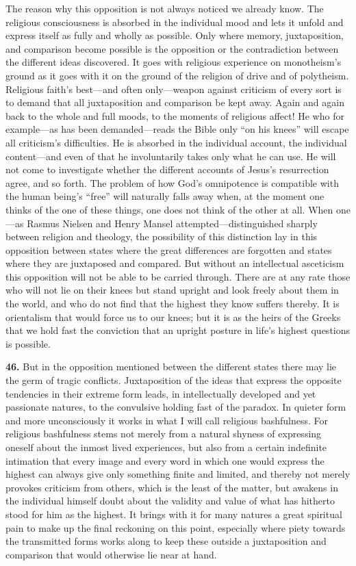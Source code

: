 \documentclass[12pt,a4paper]{book}
\newcommand{\opage}[1]{\marginnote{\footnotesize\textit{[#1]}}}
\begin{document}
The reason why this opposition is not always noticed we already know. The religious
consciousness is absorbed in the individual mood and lets it unfold and express itself as
fully and wholly as possible. Only where memory, juxtaposition, and comparison become
possible is the opposition or the contradiction between the different ideas discovered. It
goes with religious experience on monotheism's ground as it goes with it on the ground of
the religion of drive and of polytheism. Religious faith's best---and often only---weapon
against criticism of every sort is to demand that all juxtaposition and comparison be kept
away. Again and again back to the whole and full moods, to the moments of religious affect!
He who for example---as has been demanded---reads the Bible only ``on his knees'' will
escape all criticism's difficulties. He is absorbed in the individual account, the individual
content---and even of that he involuntarily takes only what he can use. He will not come to
investigate whether the different accounts of Jesus's resurrection 
\opage{107}agree, and so forth. The
problem of how God's omnipotence is compatible with the human being's ``free'' will naturally
falls away when, at the moment one thinks of the one of these things, one does not think of
the other at all. When one---as Rasmus Nielsen and Henry Mansel attempted---distinguished
sharply between religion and theology, the possibility of this distinction lay in this
opposition between states where the great differences are forgotten and states where they are
juxtaposed and compared. But without an intellectual asceticism this opposition will not be
able to be carried through. There are at any rate those who will not lie on their knees but
stand upright and look freely about them in the world, and who do not find that the highest
they know suffers thereby. It is orientalism that would force us to our knees; but it is as
the heirs of the Greeks that we hold fast the conviction that an upright posture in life's
highest questions is possible.

\medskip

\noindent\textbf{46.} But in the opposition mentioned between the different states there may
lie the germ of tragic conflicts. Juxtaposition of the ideas that express the opposite
tendencies in their extreme form leads, in intellectually developed and yet passionate
natures, to the convulsive holding fast of the paradox. In quieter form and more unconsciously
it works in what I will call religious bashfulness. For religious bashfulness stems not merely
from a natural shyness of expressing oneself about the inmost lived experiences, but also from
a certain indefinite intimation that every image and every word in which one would express the
highest can always give only something finite and limited, and thereby not merely provokes
criticism from others, which is the least of the matter, but awakens in the individual himself
doubt about the validity and value of what has hitherto stood for him as the highest. It brings
with it for many natures a great spiritual pain to make up the final reckoning on this point,
especially where piety towards the transmitted forms works along to keep these outside a
juxtaposition and comparison that would otherwise lie near at hand.
\end{document}
